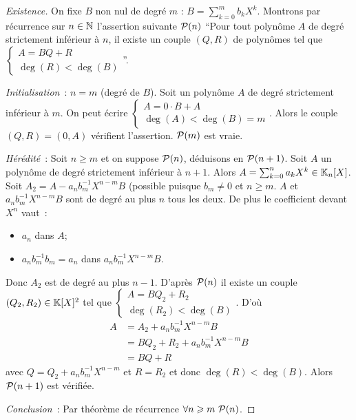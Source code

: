 \begin{proof}[Existence]
  On fixe \(B\) non nul de degré \(m\) : \(B = \sum_{k=0}^m b_k X^k\). Montrons 
  par récurrence sur \(n \in \N\) l'assertion suivante \(\P(n)\) ``Pour tout 
  polynôme \(A\) de degré strictement inférieur à \(n\), il existe un couple 
  \((Q,R)\) de polynômes tel que \(\begin{cases} A=BQ+R \\ \deg(R) < 
  \deg(B)\end{cases}\)''.

  \emph{Initialisation}~: \(n=m\) (degré de \(B\)). Soit un polynôme \(A\) de 
  degré strictement inférieur à \(m\). On peut écrire \(\begin{cases} A=0 \cdot 
  B+A \\ \deg(A) < \deg(B)=m\end{cases}\). Alors le couple \((Q,R)=(0,A)\) 
  vérifient l'assertion. \(\P(m)\) est vraie.

  \emph{Hérédité}~: Soit \(n \geqslant m\) et on suppose \(\P(n)\), déduisons en 
  \(\P(n+1)\). Soit \(A\) un polynôme de degré strictement inférieur à \(n+1\). 
  Alors \(A=\sum_{k=0}^n a_k X^k \in \K_n[X]\). Soit \(A_2 = 
  A-a_nb_m^{-1}X^{n-m}B\) (possible puisque \(b_m \neq 0\) et \(n \geqslant m\). 
  \(A\) et \(a_nb_m^{-1}X^{n-m}B\) sont de degré au plus \(n\) tous les deux. De 
  plus le coefficient devant \(X^n\) vaut~:
  \begin{itemize}
    \item \(a_n\) dans \(A\);
    \item \(a_nb_m^{-1}b_m=a_n\) dans \(a_nb_m^{-1}X^{n-m}B\).
  \end{itemize}
  Donc \(A_2\) est de degré au plus \(n-1\). D'après \(\P(n)\) il existe un 
  couple \((Q_2,R_2) \in \K[X]^2\) tel que \(\begin{cases} A=BQ_2+R_2 \\ 
  \deg(R_2) < \deg(B)\end{cases}\). D'où
  \begin{align}
    A&=A_2 + a_n b_m^{-1}X^{n-m}B\\
    &=BQ_2+R_2 +a_n b_m^{-1}X^{n-m}B\\
    &=BQ+R
  \end{align}
  avec \(Q=Q_2+a_n b_m^{-1}X^{n-m}\) et \(R=R_2\) et donc \(\deg(R) < \deg(B)\). 
  Alors \(\P(n+1)\) est vérifiée.

  \emph{Conclusion}~: Par théorème de récurrence \(\forall n \geqslant m \ 
  \P(n)\).
\end{proof}

